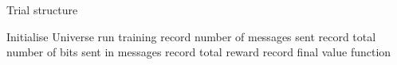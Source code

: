\begin{algorithm}
    \caption{Trial structure}\label{alg:Task1}
    \begin{algorithmic}
    \State Initialise Universe
            \State run training
                \State record number of messages sent
                \State record total number of bits sent in messages
                \State record total reward
                \State record final value function
                \State 

            \EndFor
        \EndFor
    \EndFor
    \end{algorithmic}
\end{algorithm}    
